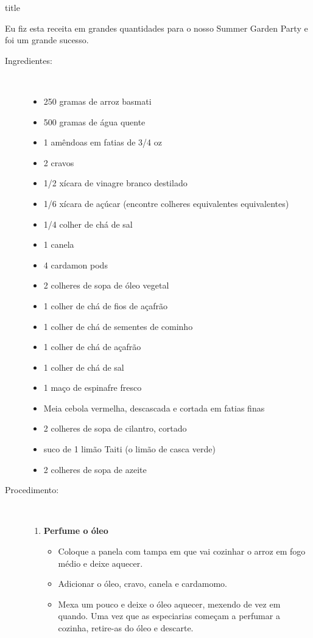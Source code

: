 \documentclass [11pt, letterpaper] {article}
\begin{document}
 {title}

Eu fiz esta receita em grandes quantidades para o nosso Summer Garden Party e foi um grande sucesso.


\begin {description}

\item [Ingredientes:] \ \\
\begin {itemize}
\item 250 gramas de arroz basmati
\item 500 gramas de água quente
\item 1 amêndoas em fatias de 3/4 oz
\item 2 cravos
\item 1/2 xícara de vinagre branco destilado
\item 1/6 xícara de açúcar (encontre colheres equivalentes equivalentes)
\item 1/4 colher de chá de sal
\item 1 canela
\item 4 cardamon pods
\item 2 colheres de sopa de óleo vegetal
\item 1 colher de chá de fios de açafrão
\item 1 colher de chá de sementes de cominho
\item 1 colher de chá de açafrão
\item 1 colher de chá de sal
\item 1 ma\c{c}o de espinafre fresco
\item Meia cebola vermelha, descascada e cortada em fatias finas
\item 2 colheres de sopa de cilantro, cortado
\item suco de 1 lim\~ao Taiti (o lim\~ao de casca verde)
\item 2 colheres de sopa de azeite
\end {itemize}


\item [Procedimento:] \ \\

\begin {enumerate}
\item {\bf Perfume o óleo}
\begin {itemize}
\item Coloque a panela com tampa em que vai cozinhar o arroz em fogo médio e deixe aquecer.
\item Adicionar o óleo, cravo, canela e cardamomo.
\item Mexa um pouco e deixe o óleo aquecer, mexendo de vez em quando. Uma vez que as especiarias começam a perfumar a cozinha, retire-as do óleo e descarte.
\end {itemize}


\end{enumerate}
\end{description}
\end{document}

